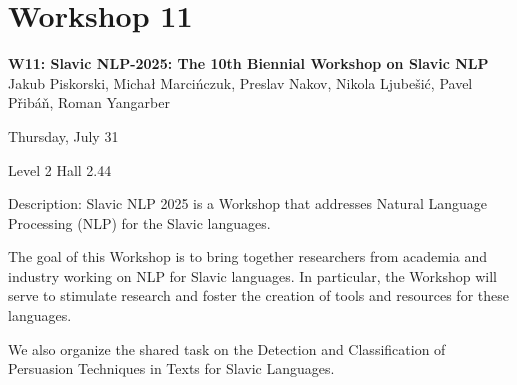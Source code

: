 \clearpage



\section[W11: Slavic NLP-2025: The 10th Biennial Workshop on Slavic NLP]{Workshop 11}
\label{workshop_11}

\begin{center}
    {\Large \textbf{W11: Slavic NLP-2025: The 10th Biennial Workshop on Slavic NLP}}\\
    

   Jakub Piskorski, Michał Marcińczuk, Preslav Nakov, Nikola Ljubešić, Pavel Přibáň, Roman Yangarber

    Thursday, July 31
    
   Level 2 Hall 2.44

\end{center}

Description: Slavic NLP 2025 is a Workshop that addresses Natural Language Processing (NLP) for the Slavic languages.

The goal of this Workshop is to bring together researchers from academia and industry working on NLP for Slavic languages. In particular, the Workshop will serve to stimulate research and foster the creation of tools and resources for these languages.

We also organize the shared task on the Detection and Classification of Persuasion Techniques in Texts for Slavic Languages.


